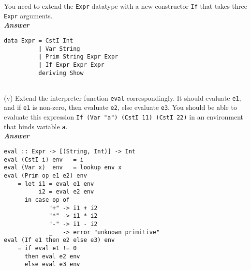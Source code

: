 \documentclass[a4paper]{article}
\begin{document}
\begin{exercise}
You need to extend the \texttt{Expr} datatype with a new constructor
\texttt{If} that takes three \texttt{Expr} arguments.\\
  
\noindent
\textbf{\emph{Answer}}
{\codesetup\begin{verbatim}
data Expr = CstI Int 
          | Var String
          | Prim String Expr Expr  
          | If Expr Expr Expr
          deriving Show
\end{verbatim}}\\

\noindent
(v) Extend the interpreter function \texttt{eval} correspondingly.  It
should evaluate \texttt{e1}, and if \texttt{e1} is non-zero, then
evaluate \texttt{e2}, else evaluate \texttt{e3}.  You should be able
to evaluate this expression \texttt{If (Var "a") (CstI 11) (CstI
  22)} in an environment that binds variable \texttt{a}.\\
      
\noindent
\textbf{\emph{Answer}}
{\codesetup\begin{verbatim}
eval :: Expr -> [(String, Int)] -> Int 
eval (CstI i) env   = i
eval (Var x)  env   = lookup env x
eval (Prim op e1 e2) env 
    = let i1 = eval e1 env
          i2 = eval e2 env
      in case op of
             "+" -> i1 + i2 
             "*" -> i1 * i2
             "-" -> i1 - i2
             _   -> error "unknown primitive"
eval (If e1 then e2 else e3) env
    = if eval e1 != 0
      then eval e2 env
      else eval e3 env
\end{verbatim}}\\

\end{exercise}
\end{document}
